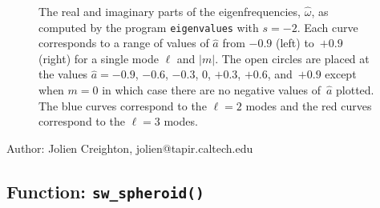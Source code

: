 \begin{figure}[h]
\begin{center}
\caption{\label{f:eigen} The real and imaginary parts of the eigenfrequencies,
  $\hat{\omega}$, as computed by the program \texttt{eigenvalues} with $s=-2$.
  Each curve corresponds to a range of values of $\hat{a}$ from $-0.9$ (left)
  to~$+0.9$ (right) for a single mode $\ell$ and $|m|$.  The open circles are
  placed at the values $\hat{a}=-0.9$, $-0.6$, $-0.3$, $0$, $+0.3$, $+0.6$,
  and~$+0.9$ except when $m=0$ in which case there are no negative values
  of~$\hat{a}$ plotted.  The blue curves correspond to the $\ell=2$ modes and
  the red curves correspond to the $\ell=3$ modes.}
\end{center}
\end{figure}

\clearpage
{}

\begin{description}
\item{Author:} Jolien Creighton, jolien@tapir.caltech.edu
\end{description}


\clearpage
\subsection{Function: \texttt{sw\_spheroid()}}
\label{ss:sw_spheroid}

